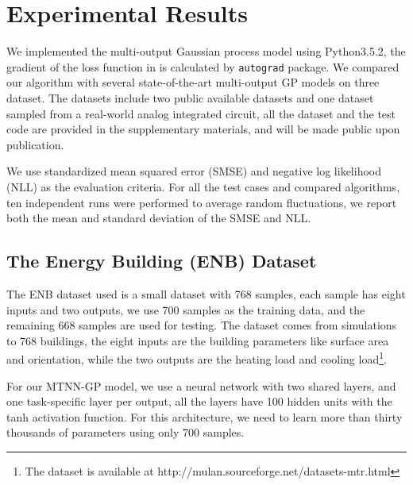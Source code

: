 \section{Experimental Results}\label{sec:report}


We implemented the multi-output Gaussian process model using Python3.5.2, the gradient of the loss function in  is calculated by \texttt{autograd} package\cite{maclaurin2015autograd}. We compared our algorithm with several state-of-the-art multi-output GP models on three dataset. The datasets include two public available datasets and one dataset sampled from a real-world analog integrated circuit, all the dataset and the test code are provided in the supplementary materials, and will be made public upon publication.

We use standardized mean squared error (SMSE) and negative log likelihood (NLL) as the evaluation criteria. For all the test cases and compared algorithms, ten independent runs were performed to average random fluctuations, we report both the mean and standard deviation of the SMSE and NLL.

\subsection{The Energy Building (ENB) Dataset}\label{sec:enb}

The ENB dataset used is a small dataset with 768 samples, each sample has eight inputs and two outputs, we use 700 samples as the training data, and the remaining 668 samples are used for testing. The dataset comes from simulations to 768 buildings\cite{spyromitros2016multi, tsanas2012accurate}, the eight inputs are the building parameters like surface area and orientation, while the two outputs are the heating load and cooling load\footnote{The dataset is available at http://mulan.sourceforge.net/datasets-mtr.html}.

For our MTNN-GP model, we use a neural network with two shared layers, and one task-specific layer per output, all the layers have 100 hidden units with the tanh activation function. For this architecture, we need to learn more than thirty thousands of parameters using only 700 samples. 

